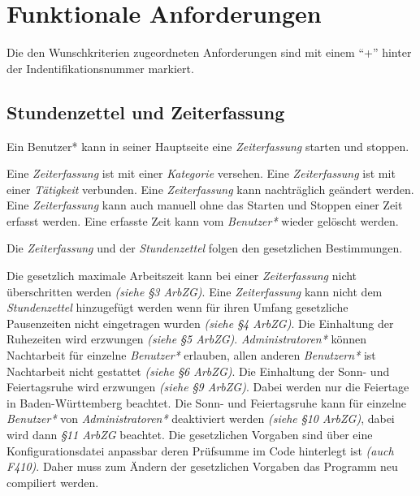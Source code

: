 \section{Funktionale Anforderungen}

Die den Wunschkriterien zugeordneten Anforderungen sind mit einem "`+"' hinter der Indentifikationsnummer markiert.

\subsection{Stundenzettel und Zeiterfassung}

\begin{requirements}
    Ein Benutzer* kann in seiner Hauptseite eine \emph{Zeiterfassung} starten und stoppen.
    \begin{requirements}
         Eine \emph{Zeiterfassung} ist mit einer \emph{Kategorie} versehen.
         Eine \emph{Zeiterfassung} ist mit einer \emph{Tätigkeit} verbunden.
         Eine \emph{Zeiterfassung} kann nachträglich geändert werden.
         Eine \emph{Zeiterfassung} kann auch manuell ohne das Starten und Stoppen einer Zeit erfasst werden.
         Eine erfasste Zeit kann vom \emph{Benutzer*} wieder gelöscht werden.
    \end{requirements}

    Die \emph{Zeiterfassung} und der \emph{Stundenzettel} folgen den gesetzlichen Bestimmungen.
    \begin{requirements}
         Die gesetzlich maximale Arbeitszeit kann bei einer \emph{Zeiterfassung} nicht überschritten werden \emph{(siehe §3 ArbZG)}.
         Eine \emph{Zeiterfassung} kann nicht dem \emph{Stundenzettel} hinzugefügt werden wenn für ihren Umfang gesetzliche Pausenzeiten nicht eingetragen wurden \emph{(siehe §4 ArbZG)}.
         Die Einhaltung der Ruhezeiten wird erzwungen \emph{(siehe §5 ArbZG)}.
         \emph{Administratoren*} können Nachtarbeit für einzelne \emph{Benutzer*} erlauben, allen anderen \emph{Benutzern*} ist Nachtarbeit nicht gestattet \emph{(siehe §6 ArbZG)}.
         Die Einhaltung der Sonn- und Feiertagsruhe wird erzwungen \emph{(siehe §9 ArbZG)}.
                Dabei werden nur die Feiertage in Baden-Württemberg beachtet.
                Die Sonn- und Feiertagsruhe kann für einzelne \emph{Benutzer*} von \emph{Administratoren*} deaktiviert werden \emph{(siehe §10 ArbZG)}, dabei wird dann \emph{§11 ArbZG} beachtet.
         Die gesetzlichen Vorgaben sind über eine Konfigurationsdatei anpassbar deren Prüfsumme im Code hinterlegt ist \emph{(auch F410)}.
                Daher muss zum Ändern der gesetzlichen Vorgaben das Programm neu compiliert werden.
    \end{requirements}


\end{requirements}
